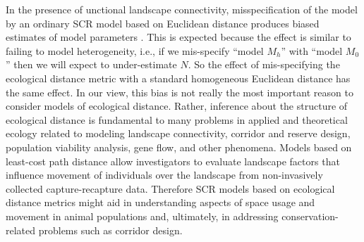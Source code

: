 In the presence of unctional landscape connectivity, misspecification
of the model by an ordinary SCR model based on Euclidean distance
produces biased estimates of model parameters
 \citep{royle_etal:2012ecol}.
 This is expected because the effect is similar
to failing to model heterogeneity, i.e., if we mis-specify ``model
$M_h$'' \citep{otis_etal:1978} with ``model $M_0$''
\citep{otis_etal:1978} then we will expect to under-estimate $N$. So
the effect of mis-specifying the ecological distance metric with a
standard homogeneous Euclidean distance has the same effect.
In our view, this bias is not really the most important reason to
consider models of ecological distance. Rather, inference about the
structure of ecological distance is fundamental to many problems in
applied and theoretical ecology related to modeling landscape
connectivity, corridor and reserve design, population viability
analysis, gene flow, and other phenomena.  Models based on least-cost
path distance allow investigators to evaluate landscape factors that
influence movement of individuals over the landscape from
non-invasively collected capture-recapture data.  Therefore SCR models
based on ecological distance metrics might aid in understanding
aspects of space usage and movement in animal populations and,
ultimately, in addressing conservation-related problems such as
corridor design.





























